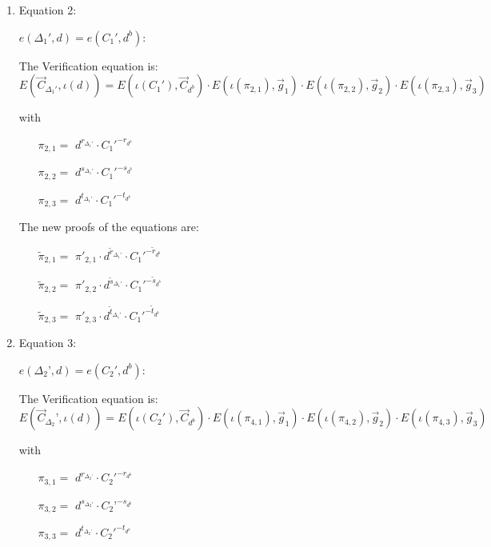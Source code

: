 \begin{description}
\begin{enumerate}
  \item Equation 2:

    $e(\boxed{\Delta_1'},d) = e(C_1', \boxed{d^b})$:
    
    The Verification equation is:  $E(\vec{C}_{\Delta_1'}, \iota(d)) = E(\iota(C_1'), \vec{C}_{d^b}) \cdot E(\iota(\pi_{2,1}), \vec{g}_1)\cdot E(\iota(\pi_{2,2}), \vec{g}_2)\cdot E(\iota(\pi_{2,3}), \vec{g}_3)$
    
    with
    \begin{itemize}
    \item[$\pi_{2,1} = $] $d^{r_{\Delta_1'}} \cdot C_1'^{-r_{d^b}}$
    \item[$\pi_{2,2} = $] $d^{s_{\Delta_1'}} \cdot C_1'^{-s_{d^b}}$
    \item[$\pi_{2,3} = $] $d^{t_{\Delta_1'}} \cdot C_1'^{-t_{d^b}}$
    \end{itemize}

    The new proofs of the equations are:
    
    \begin{itemize}
    \item[$\tilde{\pi}_{2,1} = $] $\pi'_{2,1} \cdot d^{\tilde{r}_{\Delta_1'}}\cdot C_1'^{-\tilde{r}_{d^b}}$   
    \item[$\tilde{\pi}_{2,2} = $] $\pi'_{2,2} \cdot d^{\tilde{s}_{\Delta_1'}}\cdot C_1'^{-\tilde{s}_{d^b}}$   
    \item[$\tilde{\pi}_{2,3} = $] $\pi'_{2,3} \cdot d^{\tilde{t}_{\Delta_1'}}\cdot C_1'^{-\tilde{t}_{d^b}}$ 
    \end{itemize}



  \item Equation 3:
    
    $e(\boxed{\Delta_2’},d) = e(C_2', \boxed{d^b})$:
    
    The Verification equation is:  $E(\vec{C}_{\Delta_2}’, \iota(d)) = E(\iota(C_2'), \vec{C}_{d^b}) \cdot E(\iota(\pi_{4,1}), \vec{g}_1)\cdot E(\iota(\pi_{4,2}), \vec{g}_2)\cdot E(\iota(\pi_{4,3}), \vec{g}_3)$
    
    with
    \begin{itemize}
    \item[$\pi_{3,1} = $] $d^{r_{\Delta_2’}} \cdot C_2'^{-r_{d^b}}$ 
    \item[$\pi_{3,2} = $] $d^{s_{\Delta_2'}} \cdot C_2’^{-s_{d^b}}$ 
    \item[$\pi_{3,3} = $] $d^{t_{\Delta_2’}} \cdot C_2'^{-t_{d^b}}$ 
    \end{itemize}
    

\end{enumerate}
\end{description}
